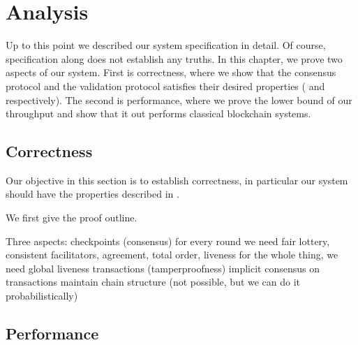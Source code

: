 \chapter{Analysis}
\label{ch:analysis}

Up to this point we described our system specification in detail.
Of course, specification along does not establish any truths.
In this chapter, we prove two aspects of our system.
First is correctness,
where we show that the consensus protocol and the validation protocol satisfies their desired properties
( and  respectively).
The second is performance,
where we prove the lower bound of our throughput and show that it out performs classical blockchain systems.

\section{Correctness}
Our objective in this section is to establish correctness,
in particular our system should have the properties described in .

We first give the proof outline.


Three aspects:
checkpoints (consensus)
    for every round we need fair lottery, consistent facilitators, agreement, total order, liveness
    for the whole thing, we need global liveness
transactions (tamperproofness)
    implicit consensus on transactions
    maintain chain structure (not possible, but we can do it probabilistically)
    


\section{Performance}